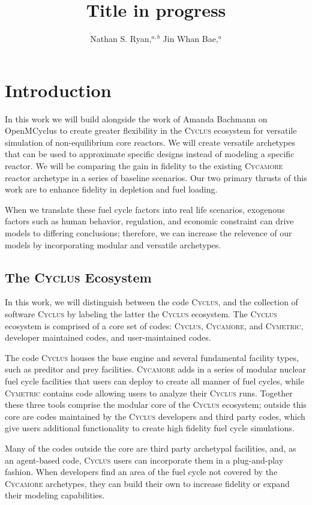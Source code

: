\documentclass{anstrans}
\title{Title in progress}
\author{Nathan S. Ryan,$^{a, b}$ Jin Whan Bae,$^{a}$}
\institute{
$^{a}$Research and Test Reactor Physics Group, Oak Ridge National Laboratory,
Oak Ridge, TN
\and
$^{b}$Advanced Reactors and Fuel Cycles Group, University of Illinois Urbana-Champaign, Urbana, IL, nsryan2@illinois.edu
}
\newcommand{\cyclus}{\textsc{Cyclus}\xspace} %
\newcommand{\cycamore}{\textsc{Cycamore}\xspace} %
\newcommand{\cymetric}{\textsc{Cymetric}\xspace} %
\begin{document}

\section{Introduction}

In this work we will build alongside the work of Amanda Bachmann on OpenMCyclus \cite{bachmann_thesis_2023} to create greater flexibility in the \cyclus \cite{cyclus_intro} ecosystem for versatile simulation of non-equilibrium core reactors. We will create versatile archetypes that can be used to approximate specific designs instead of modeling a specific reactor. We will be comparing the gain in fidelity to the existing \cycamore reactor archetype in a series of baseline scenarios. Our two primary thrusts of this work are to enhance fidelity in depletion and fuel loading.



When we translate these fuel cycle factors into real life scenarios, exogenous factors such as human behavior, regulation, and economic constraint can drive models to differing conclusions; therefore, we can increase the relevence of our models by incorporating modular and versatile archetypes.

\subsection{The \cyclus Ecosystem}
In this work, we will distinguish between the code \cyclus, and the collection of software \cyclus by labeling the latter the \cyclus ecosystem. The \cyclus ecosystem is comprised of a core set of codes: \cyclus, \cycamore, and \cymetric, developer maintained codes, and user-maintained codes.

The code \cyclus houses the base engine and several fundamental facility types, such as preditor and prey facilities. \cycamore adds in a series of modular nuclear fuel cycle facilities that users can deploy to create all manner of fuel cycles, while \cymetric contains code allowing users to analyze their \cyclus runs. Together these three tools comprise the modular core of the \cyclus ecosystem; outside this core are codes maintained by the \cyclus developers and third party codes, which give users additional functionality to create high fidelity fuel cycle simulations.

Many of the codes outside the core are third party archetypal facilities, and, as an agent-based code, \cyclus users can incorporate them in a plug-and-play fashion. When developers find an area of the fuel cycle not covered by the \cycamore archetypes, they can build their own to increase fidelity or expand their modeling capabilities.
\end{document}

